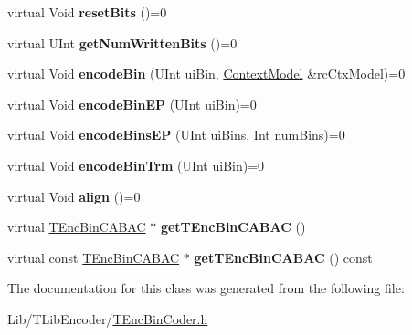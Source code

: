\begin{DoxyCompactItemize}
virtual Void {\bfseries reset\+Bits} ()=0
\item 
\mbox{\label{class_t_enc_bin_if_af6f35d7935d937118e0b7a7a7bc70cbf}} 
virtual U\+Int {\bfseries get\+Num\+Written\+Bits} ()=0
\item 
\mbox{\label{class_t_enc_bin_if_a9c465287ac638534c8b9ea61bb143776}} 
virtual Void {\bfseries encode\+Bin} (U\+Int ui\+Bin, \hyperlink{class_context_model}{Context\+Model} \&rc\+Ctx\+Model)=0
\item 
\mbox{\label{class_t_enc_bin_if_a2869e4c49af2acdbeee7b668db64221a}} 
virtual Void {\bfseries encode\+Bin\+EP} (U\+Int ui\+Bin)=0
\item 
\mbox{\label{class_t_enc_bin_if_a06ada3bc7298984f1743d3570b024c14}} 
virtual Void {\bfseries encode\+Bins\+EP} (U\+Int ui\+Bins, Int num\+Bins)=0
\item 
\mbox{\label{class_t_enc_bin_if_a0eb9053a7a74802e73055fd23015019e}} 
virtual Void {\bfseries encode\+Bin\+Trm} (U\+Int ui\+Bin)=0
\item 
\mbox{\label{class_t_enc_bin_if_aed37d9f273fe0ef2ccf82560b7435ff8}} 
virtual Void {\bfseries align} ()=0
\item 
\mbox{\label{class_t_enc_bin_if_a49be3e1b05e22547f3a35ba3fe1fcbed}} 
virtual \hyperlink{class_t_enc_bin_c_a_b_a_c}{T\+Enc\+Bin\+C\+A\+B\+AC} $\ast$ {\bfseries get\+T\+Enc\+Bin\+C\+A\+B\+AC} ()
\item 
\mbox{\label{class_t_enc_bin_if_ab36bfddab7b0a6f37e33488218a8bc4f}} 
virtual const \hyperlink{class_t_enc_bin_c_a_b_a_c}{T\+Enc\+Bin\+C\+A\+B\+AC} $\ast$ {\bfseries get\+T\+Enc\+Bin\+C\+A\+B\+AC} () const
\end{DoxyCompactItemize}


The documentation for this class was generated from the following file\+:\begin{DoxyCompactItemize}
\item 
Lib/\+T\+Lib\+Encoder/\hyperlink{_t_enc_bin_coder_8h}{T\+Enc\+Bin\+Coder.\+h}\end{DoxyCompactItemize}
